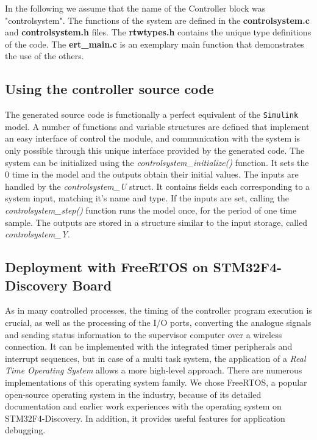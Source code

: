 In the following we assume that the name of the Controller block was "controlsystem". The functions of the system are defined in the \textbf{controlsystem.c} and \textbf{controlsystem.h} files. The \textbf{rtwtypes.h} contains the unique type definitions of the code. The \textbf{ert\_main.c} is an exemplary main function that demonstrates the use of the others.

\subsection{Using the controller source code}

The generated source code is functionally a perfect equivalent of the \verb!Simulink! model. A number of functions and variable structures are defined that implement an easy interface of control the module, and communication with the system is only possible through this unique interface provided by the generated code. The system can be initialized using the \emph{controlsystem\_initialize()} function. It sets the 0 time in the model and the outputs obtain their initial values. The inputs are handled by the \emph{controlsystem\_U} struct. It contains fields each corresponding to a system input, matching it's name and type. If the inputs are set, calling the \emph{controlsystem\_step()} function runs the model once, for the period of one time sample. The outputs are stored in a structure similar to the input storage, called \emph{controlsystem\_Y}.

\subsection{Deployment with FreeRTOS on STM32F4-Discovery Board}

As in many controlled processes, the timing of the controller program execution is crucial, as well as the processing of the I/O ports, converting the analogue signals and sending status information to the supervisor computer over a wireless connection. It can be implemented with the integrated timer peripherals and interrupt sequences, but in case of a multi task system, the application of a \emph{Real Time Operating System} allows a more high-level approach. There are numerous implementations of this operating system family. We chose FreeRTOS, a popular open-source operating system in the industry, because of its detailed documentation and earlier work experiences with the operating system on STM32F4-Discovery. In addition, it provides useful features for application debugging.

